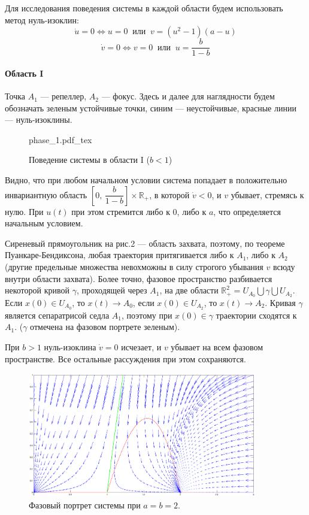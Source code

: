 \documentclass[16pt]{article}
\newcommand{\incfig}[2]{%
    \def\svgwidth{#2 mm}
    {#1.pdf_tex}
}
\newcommand\Real{\mathbb{R}}
\newcommand\Pict[3]{
\begin{figure}[h!]
    \centering
    \incfig{#1}{#3}
    \caption{#2}
    \label{fig:#1}
\end{figure}
}
\begin{document}
Для исследования поведения системы в каждой области будем использовать метод нуль-изоклин:
$$\dot u = 0 \Leftrightarrow u = 0 \ \text{ или }\ v = (u^2 - 1)(a-u)$$
$$\dot v = 0 \Leftrightarrow v = 0\ \text{ или }\ u = \dfrac{b}{1-b}$$

\paragraph{Область I} Точка $A_1$ --- репеллер, $A_2$ --- фокус.
Здесь и далее для наглядности будем обозначать зеленым устойчивые точки, синим --- неустойчивые, красные линии ---
нуль-изоклины.

\Pict{phase_1}{Поведение системы в области I ($b < 1$)}{70}

Видно, что при любом начальном условии система попадает в положительно инвариантную
область $\left[0,\, \dfrac{b}{1-b}\right] \times \Real_+$, в которой $\dot v < 0$, и $v$ убывает, стремясь к нулю.
При $u(t)$ при этом стремится либо к 0, либо к $a$, что определяется начальным условием.

Сиреневый прямоугольник на рис.2 --- область захвата, поэтому, по теореме Пуанкаре-Бендиксона, любая траектория
притягивается либо к $A_1$, либо к $A_2$ (другие предельные множества невохможны в силу строгого убывания $v$ всюду
внутри области захвата). Более точно, фазовое пространство разбивается некоторой кривой $\gamma$, проходящей через $A_1$,
на две области $\Real_+^2 = U_{A_0} \bigcup \gamma \bigcup U_{A_2}$. Если $x(0) \in U_{A_0}$, то $x(t) \to A_0$, если 
$x(0) \in U_{A_2}$, то $x(t) \to A_2$. Кривая $\gamma$ является сепаратрисой седла $A_1$, поэтому при
$x(0) \in \gamma$ траектории сходятся к $A_1$. ($\gamma$ отмечена на фазовом портрете зеленым).

При $b > 1$ нуль-изоклина $\dot v = 0$ исчезает, и $v$ убывает на всем фазовом пространстве. Все остальные
рассуждения при этом сохраняются.
 
\begin{figure}[h]
\begin{center}
\includegraphics[width=100mm]{ph1.eps}
\caption{Фазовый портрет системы при $a = b = 2$.}
\end{center}
\end{figure}
\end{document}
